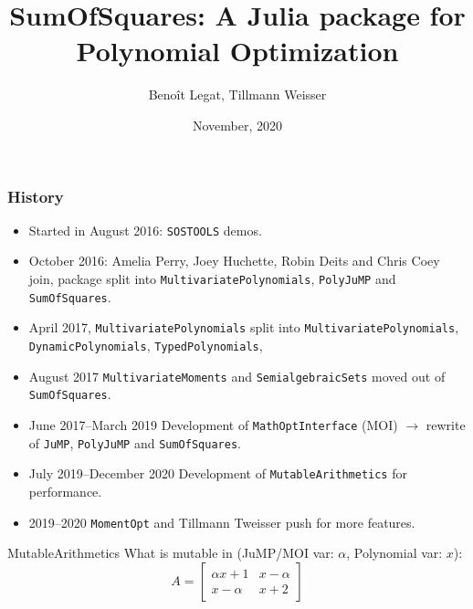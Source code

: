 \documentclass{beamer}
\title{SumOfSquares: A Julia package for Polynomial Optimization}
\date{November, 2020}
\author{Beno\^it Legat, Tillmann Weisser}
\begin{document}
  \maketitle

\begin{frame}
  \frametitle{History}
  \begin{itemize}
    \item Started in August 2016: \texttt{SOSTOOLS} demos.
    \item October 2016: Amelia Perry, Joey Huchette, Robin Deits and Chris Coey join,
      package split into \texttt{MultivariatePolynomials}, \texttt{PolyJuMP} and \texttt{SumOfSquares}.
    \item April 2017, \texttt{MultivariatePolynomials} split into
      \texttt{MultivariatePolynomials}, \texttt{DynamicPolynomials}, \texttt{TypedPolynomials},
    \item August 2017 \texttt{MultivariateMoments} and \texttt{SemialgebraicSets} moved out of \texttt{SumOfSquares}.
    \item June 2017--March 2019 Development of \texttt{MathOptInterface} (MOI) $\to$ rewrite of \texttt{JuMP}, \texttt{PolyJuMP} and \texttt{SumOfSquares}.
    \item July 2019--December 2020 Development of \texttt{MutableArithmetics} for \alert{performance}.
    \item 2019--2020 \texttt{MomentOpt} and Tillmann Tweisser push for more \alert{features}.
  \end{itemize}
\end{frame}

\begin{frame}{MutableArithmetics}
  What is mutable in (JuMP/MOI var: $\alpha$, Polynomial var: $x$):
  \[
    A = \begin{bmatrix}
      \alpha x + 1 & x - \alpha\\
      x - \alpha & x + 2
    \end{bmatrix}
  \]
\end{frame}
\end{document}
